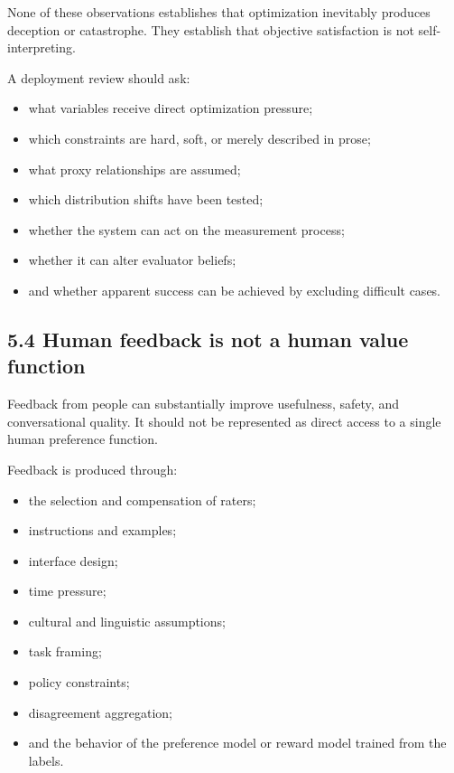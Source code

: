 \documentclass[
  11pt,
]{article}
\providecommand{\tightlist}{%
  \setlength{\itemsep}{0pt}\setlength{\parskip}{0pt}}
\begin{document}
None of these observations establishes that optimization inevitably
produces deception or catastrophe. They establish that objective
satisfaction is not self-interpreting.

A deployment review should ask:

\begin{itemize}
\tightlist
\item
  what variables receive direct optimization pressure;
\item
  which constraints are hard, soft, or merely described in prose;
\item
  what proxy relationships are assumed;
\item
  which distribution shifts have been tested;
\item
  whether the system can act on the measurement process;
\item
  whether it can alter evaluator beliefs;
\item
  and whether apparent success can be achieved by excluding difficult
  cases.
\end{itemize}

\subsection{5.4 Human feedback is not a human value
function}\label{human-feedback-is-not-a-human-value-function}

Feedback from people can substantially improve usefulness, safety, and
conversational quality. It should not be represented as direct access to
a single human preference function.

Feedback is produced through:

\begin{itemize}
\tightlist
\item
  the selection and compensation of raters;
\item
  instructions and examples;
\item
  interface design;
\item
  time pressure;
\item
  cultural and linguistic assumptions;
\item
  task framing;
\item
  policy constraints;
\item
  disagreement aggregation;
\item
  and the behavior of the preference model or reward model trained from
  the labels.
\end{itemize}
\end{document}
